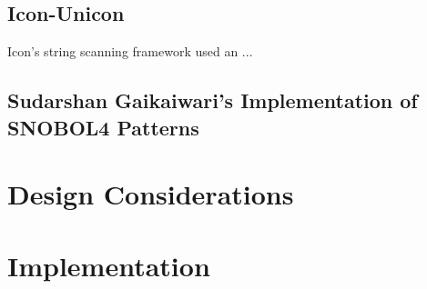 \documentclass{article}
\begin{document}
\subsection{Icon-Unicon}
Icon's string scanning framework used an ...

\subsection{Sudarshan Gaikaiwari's Implementation of SNOBOL4 Patterns}

\section{Design Considerations}

\section{Implementation}

\pagebreak


\end{document}
